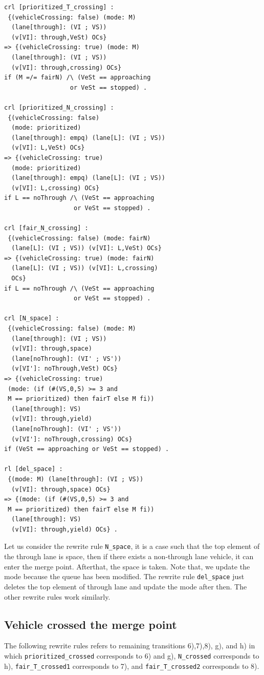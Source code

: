 \documentclass[10pt, conference, compsocconf]{IEEEtran}
\begin{document}
\begin{small}
  \begin{verbatim}
crl [prioritized_T_crossing] : 
 {(vehicleCrossing: false) (mode: M) 
  (lane[through]: (VI ; VS)) 
  (v[VI]: through,VeSt) OCs} 
=> {(vehicleCrossing: true) (mode: M) 
  (lane[through]: (VI ; VS)) 
  (v[VI]: through,crossing) OCs} 
if (M =/= fairN) /\ (VeSt == approaching 
                  or VeSt == stopped) .

crl [prioritized_N_crossing] : 
 {(vehicleCrossing: false) 
  (mode: prioritized) 
  (lane[through]: empq) (lane[L]: (VI ; VS)) 
  (v[VI]: L,VeSt) OCs} 
=> {(vehicleCrossing: true) 
  (mode: prioritized) 
  (lane[through]: empq) (lane[L]: (VI ; VS)) 
  (v[VI]: L,crossing) OCs}
if L == noThrough /\ (VeSt == approaching 
                   or VeSt == stopped) .

crl [fair_N_crossing] : 
 {(vehicleCrossing: false) (mode: fairN) 
  (lane[L]: (VI ; VS)) (v[VI]: L,VeSt) OCs} 
=> {(vehicleCrossing: true) (mode: fairN) 
  (lane[L]: (VI ; VS)) (v[VI]: L,crossing) 
  OCs} 
if L == noThrough /\ (VeSt == approaching 
                   or VeSt == stopped) .

crl [N_space] : 
 {(vehicleCrossing: false) (mode: M)
  (lane[through]: (VI ; VS)) 
  (v[VI]: through,space) 
  (lane[noThrough]: (VI' ; VS')) 
  (v[VI']: noThrough,VeSt) OCs} 
=> {(vehicleCrossing: true) 
 (mode: (if (#(VS,0,5) >= 3 and 
 M == prioritized) then fairT else M fi))
  (lane[through]: VS) 
  (v[VI]: through,yield)
  (lane[noThrough]: (VI' ; VS')) 
  (v[VI']: noThrough,crossing) OCs}
if (VeSt == approaching or VeSt == stopped) .

rl [del_space] : 
 {(mode: M) (lane[through]: (VI ; VS)) 
  (v[VI]: through,space) OCs} 
=> {(mode: (if (#(VS,0,5) >= 3 and 
 M == prioritized) then fairT else M fi))
  (lane[through]: VS) 
  (v[VI]: through,yield) OCs} .
  \end{verbatim}
\end{small}

Let us consider the rewrite rule \verb!N_space!, it is a case such that
the top element of the through lane is space, then if there exists a 
non-through lane vehicle, it can enter the merge point. Afterthat, 
the space is taken. Note that, we update the mode because the queue
has been modified. The rewrite rule \verb!del_space! just deletes 
the top element of through lane and update the mode after then.
The other rewrite rules work similarly.

\subsection{Vehicle crossed the merge point}
The following rewrite rules refers to remaining transitions 6),7),8), g), and h) in which
\verb!prioritized_crossed! corresponds to 6) and g), \verb!N_crossed! corresponds to h),
\verb!fair_T_crossed1! corresponds to 7), and \verb!fair_T_crossed2! corresponds to 8).
\end{document}
